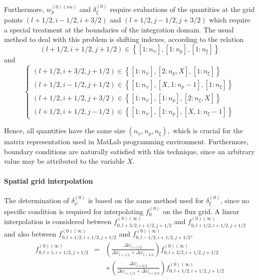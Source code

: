 Furthermore, $w_{p}^{\left( 0\right) (nu)}$ and $\delta _{\xi }^{\left(
0\right) }$ require evaluations of the quantities at the grid points $\left(
l+1/2,i-1/2,i+3/2\right) $ and $\left( l+1/2,j-1/2,j+3/2\right) $ which
require a special treatment at the boundaries of the integration domain. The
usual method to deal with this problem is shifting indexes, according to the
relation
\[
\left( l+1/2,i+1/2,j+1/2\right) \in \left\{ \left[ 1:n_{\psi }\right]
,\left[ 1:n_{p}\right] ,\left[ 1:n_{\xi }\right] \right\}
\]
and
\begin{equation}
\left\{
\begin{array}{l}
\left( l+1/2,i+3/2,j+1/2\right) \in \left\{ \left[ 1:n_{\psi }\right]
,\left[ 2:n_{p},X\right] ,\left[ 1:n_{\xi }\right] \right\} \\
\left( l+1/2,i-1/2,j+1/2\right) \in \left\{ \left[ 1:n_{\psi }\right]
,\left[ X,1:n_{p}-1\right] ,\left[ 1:n_{\xi }\right] \right\} \\
\left( l+1/2,i+1/2,j+3/2\right) \in \left\{ \left[ 1:n_{\psi }\right]
,\left[ 1:n_{p}\right] ,\left[ 2:n_{\xi },X\right] \right\} \\
\left( l+1/2,i+1/2,j-1/2\right) \in \left\{ \left[ 1:n_{\psi }\right]
,\left[ 1:n_{p}\right] ,\left[ X,1:n_{\xi }-1\right] \right\}
\end{array}
\right.
\end{equation}

Hence, all quantities have the same size $\left( n_{\psi },n_{p},n_{\xi
}\right) ,$ which is crucial for the matrix representation used in MatLab
programming environment. Furthermore, boundary conditions are naturally
satisfied with this technique, since an arbitrary value may be attributed to
the variable $X$.

\paragraph{Spatial grid interpolation}

The determination of $\delta _{\psi }^{\left( 0\right) }$ is based on the
same method used for $\delta _{\xi }^{\left( 0\right) }$, since no specific
condition is required for interpolating $f_{0}^{\left( 0\right) }$ on the
flux grid. A linear interpolation is considered between $%
f_{0,l+3/2,i+1/2,j+1/2}^{\left( 0\right) (\infty )}$ and $%
f_{0,l+1/2,i+1/2,j+1/2}^{\left( 0\right) (\infty )}$ and also between $%
f_{0,l+1/2,i+1/2,j+1/2}^{\left( 0\right) (\infty )}$ and $%
f_{0,l-1/2,i+1/2,j+1/2}^{\left( 0\right) (\infty )}$,
\begin{eqnarray}
f_{0,l+1,i+1/2,j+1/2}^{\left( 0\right) (\infty )} &=&\left( \frac{\Delta
\psi _{l+1/2}}{\Delta \psi _{l+1/2}+\Delta \psi _{l+3/2}}\right)
f_{0,l+3/2,i+1/2,j+1/2}^{\left( 0\right) (\infty )}  \nonumber \\
&&+\left( \frac{\Delta \psi _{l+3/2}}{\Delta \psi _{l+1/2}+\Delta \psi
_{l+3/2}}\right) f_{0,l+1/2,i+1/2,j+1/2}^{\left( 0\right) (\infty )}
\end{eqnarray}

